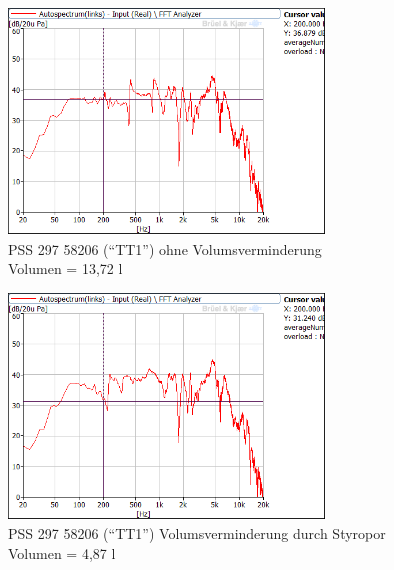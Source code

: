 \newpage
\begin{figure} [H]
	\centering
	\includegraphics[width=0.75\textwidth]{img/Optimierung/TT/TT1_ohneAllem.png}
	\caption{PSS 297 58206 (\enquote{TT1}) ohne Volumsverminderung \\Volumen = 13,72 l}
	\label{fig:4.4.3.1}
\end{figure}

\begin{figure} [H]
	\centering
	\includegraphics[width=0.75\textwidth]{img/Optimierung/TT/TT1_Styro_4-87l.png}
	\caption{PSS 297 58206 (\enquote{TT1}) Volumsverminderung durch Styropor \\Volumen = 4,87 l}
	\label{fig:4.4.3.2}
\end{figure}

